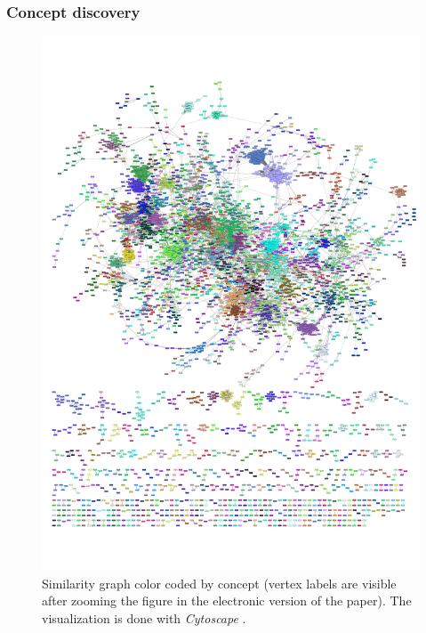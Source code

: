 \documentclass{kais}
\begin{document}
\subsubsection{Concept discovery}
\label{subsubsec: concept-discovery}

\begin{figure}
\centerline{\includegraphics[width=1.0\columnwidth]{figures/slpa-complete-adjusted_cropped.pdf}}
\caption{Similarity graph color coded by concept (vertex labels are visible after zooming the figure in the electronic 
version of the paper). The visualization is done with \emph{Cytoscape} \protect\cite{Shannon2003}.}
\label{fig:graph-overview}
\end{figure}
\end{document}
